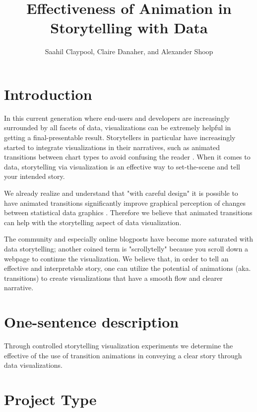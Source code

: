 \documentclass{proc}
\begin{document}
\title{Effectiveness of Animation in Storytelling with Data}

\author{Saahil Claypool, Claire Danaher, and Alexander Shoop}

\maketitle

\section{Introduction}

In this current generation where end-users and developers are increasingly surrounded by all facets of data, visualizations can be extremely helpful in getting a final-presentable result. Storytellers in particular have increasingly started to integrate visualizations in their narratives, such as animated transitions between chart types to avoid confusing the reader \cite{segelNarrative}. When it comes to data, storytelling via visualization is an effective way to set-the-scene and tell your intended story.

We already realize and understand that "with careful design" it is possible to have animated transitions significantly improve graphical perception of changes between statistical data graphics \cite{heerAnimated}. Therefore we believe that animated transitions can help with the storytelling aspect of data visualization. 

The community and especially online blogposts have become more saturated with data storytelling; another coined term is "scrollytelly" because you scroll down a webpage to continue the visualization. We believe that, in order to tell an effective and interpretable story, one can utilize the potential of animations (aka. transitions) to create visualizations that have a smooth flow and clearer narrative.

\section{One-sentence description}

Through controlled storytelling visualization experiments we determine the effective of the use of transition animations in conveying a clear story through data visualizations.

\section{Project Type}
\end{document}
